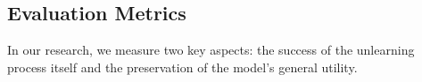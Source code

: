 \documentclass[sigconf,anonymous]{aamas}
\begin{document}






 \subsection{Evaluation Metrics}
\label{sec:evaluation}

In our research, we measure two key aspects: the success of the unlearning process itself and the preservation of the model's general utility.
\end{document}
